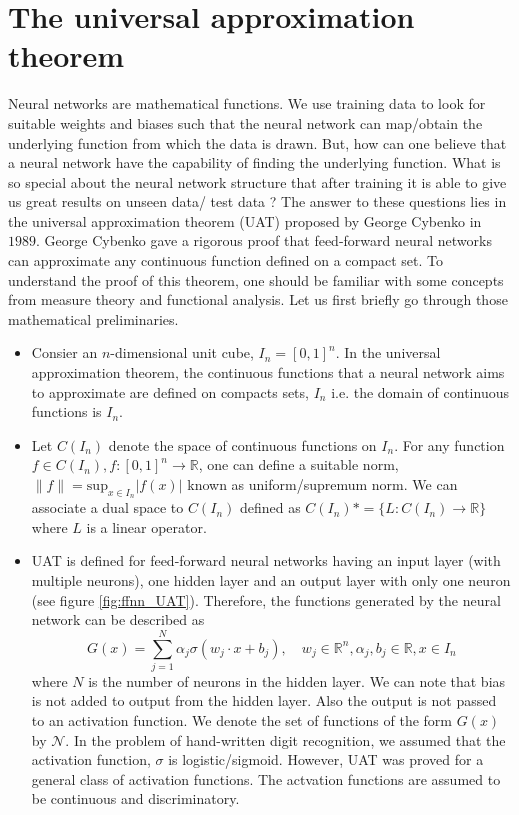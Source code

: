 \section{The universal approximation theorem}
Neural networks are mathematical functions. We use training data to look for suitable weights and biases
such that the neural network can map/obtain the underlying function from which the data is drawn. But, how can one
believe that a neural network have the capability of finding the underlying function. What is so special about the
neural network structure that after training it is able to give us great results on unseen data/ test data ? The answer to these
questions lies in the universal approximation theorem (UAT) proposed by George Cybenko in $1989$. 
George Cybenko gave a rigorous proof that feed-forward neural networks can approximate any continuous function defined on a compact set. To understand the 
proof of this theorem, one should be familiar with some concepts from measure theory and functional analysis. 
Let us first briefly go through those mathematical preliminaries.
\begin{itemize}
    \item Consier an $n$-dimensional unit cube, $I_n = [0,1]^n$. In the universal approximation theorem, the continuous
    functions that a neural network aims to approximate are defined on compacts sets, $I_n$ i.e. the domain of continuous
    functions is $I_n$. 
    \item Let $C(I_n)$ denote the space of continuous functions on $I_n$. 
    For any function $f \in C(I_n), f : [0,1]^n \rightarrow \mathbb{R}$, one can define a suitable norm, 
    $\|f\| = \text{sup}_{x \in I_n} |f(x)|$ known as uniform/supremum norm. We can associate a dual space to $C(I_n)$ 
    defined as $C(I_n)* = \{L : C(I_n) \rightarrow \mathbb{R}\}$ where $L$ is a linear operator.
    \item UAT is defined for feed-forward neural networks having an input layer (with multiple neurons), one hidden layer and
    an output layer with only one neuron (see figure \ref{fig:ffnn_UAT}). Therefore, the functions generated by the neural network can be described as
    $$G(x) = \sum_{j=1}^{N} \alpha_j \sigma (w_j\cdot x + b_j), \quad w_j \in \mathbb{R}^n, \alpha_j, b_j \in \mathbb{R}, x \in I_n$$
    where $N$ is the number of neurons in the hidden layer. We can note that bias is not added to output from the hidden
    layer. Also the output is not passed to an activation function. We denote the set of functions of the form $G(x)$
    by $\mathcal{N}$. In the problem of hand-written digit recognition, we assumed that the activation function, $\sigma$ is logistic/sigmoid. 
    However, UAT was proved for a general class of activation functions. The actvation functions are assumed to be continuous and 
    discriminatory. 
\end{itemize} 

